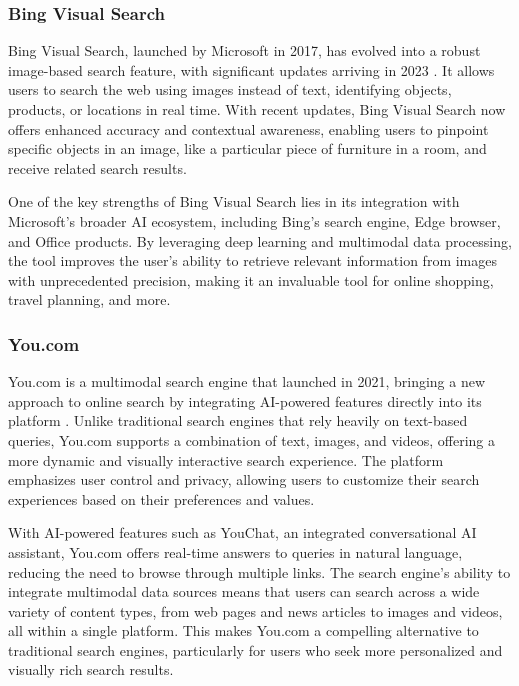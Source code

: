 \subsubsection{Bing Visual Search}

Bing Visual Search, launched by Microsoft in 2017, has evolved into a robust image-based search feature, with significant updates arriving in 2023 \cite{BingVisualSearch}. 
It allows users to search the web using images instead of text, identifying objects, products, or locations in real time. 
With recent updates, Bing Visual Search now offers enhanced accuracy and contextual awareness, enabling users to pinpoint specific objects in an image, like a particular piece of furniture in a room, and receive related search results.

One of the key strengths of Bing Visual Search lies in its integration with Microsoft's broader AI ecosystem, including Bing's search engine, Edge browser, and Office products. 
By leveraging deep learning and multimodal data processing, the tool improves the user's ability to retrieve relevant information from images with unprecedented precision, making it an invaluable tool for online shopping, travel planning, and more.

\subsubsection{You.com}

You.com is a multimodal search engine that launched in 2021, bringing a new approach to online search by integrating AI-powered features directly into its platform \cite{You.com}. 
Unlike traditional search engines that rely heavily on text-based queries, You.com supports a combination of text, images, and videos, offering a more dynamic and visually interactive search experience. 
The platform emphasizes user control and privacy, allowing users to customize their search experiences based on their preferences and values.

With AI-powered features such as YouChat, an integrated conversational AI assistant, You.com offers real-time answers to queries in natural language, reducing the need to browse through multiple links. 
The search engine's ability to integrate multimodal data sources means that users can search across a wide variety of content types, from web pages and news articles to images and videos, all within a single platform. 
This makes You.com a compelling alternative to traditional search engines, particularly for users who seek more personalized and visually rich search results.

